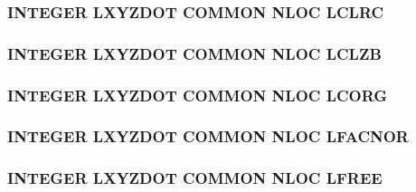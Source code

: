 \hypertarget{nloc_8com_a50c67f35190ba28d966fa34213f34d31}{
\subsubsection[{L\-C\-L\-R\-C}]{\setlength{\rightskip}{0pt plus 5cm}I\-N\-T\-E\-G\-E\-R L\-X\-Y\-Z\-D\-O\-T C\-O\-M\-M\-O\-N N\-L\-O\-C L\-C\-L\-R\-C}}\label{nloc_8com_a50c67f35190ba28d966fa34213f34d31}
\hypertarget{nloc_8com_a28bfbe31dd157ea6cf996d8dc53c016b}{
\subsubsection[{L\-C\-L\-Z\-B}]{\setlength{\rightskip}{0pt plus 5cm}I\-N\-T\-E\-G\-E\-R L\-X\-Y\-Z\-D\-O\-T C\-O\-M\-M\-O\-N N\-L\-O\-C L\-C\-L\-Z\-B}}\label{nloc_8com_a28bfbe31dd157ea6cf996d8dc53c016b}
\hypertarget{nloc_8com_a0af2a3cec2780018a2c188475b263b7b}{
\subsubsection[{L\-C\-O\-R\-G}]{\setlength{\rightskip}{0pt plus 5cm}I\-N\-T\-E\-G\-E\-R L\-X\-Y\-Z\-D\-O\-T C\-O\-M\-M\-O\-N N\-L\-O\-C L\-C\-O\-R\-G}}\label{nloc_8com_a0af2a3cec2780018a2c188475b263b7b}
\hypertarget{nloc_8com_a9168556bdefddc5bf02b5c8b8bd27e24}{
\subsubsection[{L\-F\-A\-C\-N\-O\-R}]{\setlength{\rightskip}{0pt plus 5cm}I\-N\-T\-E\-G\-E\-R L\-X\-Y\-Z\-D\-O\-T C\-O\-M\-M\-O\-N N\-L\-O\-C L\-F\-A\-C\-N\-O\-R}}\label{nloc_8com_a9168556bdefddc5bf02b5c8b8bd27e24}
\hypertarget{nloc_8com_ad8866cf17212aeb1747c0d878ce02b6a}{
\subsubsection[{L\-F\-R\-E\-E}]{\setlength{\rightskip}{0pt plus 5cm}I\-N\-T\-E\-G\-E\-R L\-X\-Y\-Z\-D\-O\-T C\-O\-M\-M\-O\-N N\-L\-O\-C L\-F\-R\-E\-E}}\label{nloc_8com_ad8866cf17212aeb1747c0d878ce02b6a}
